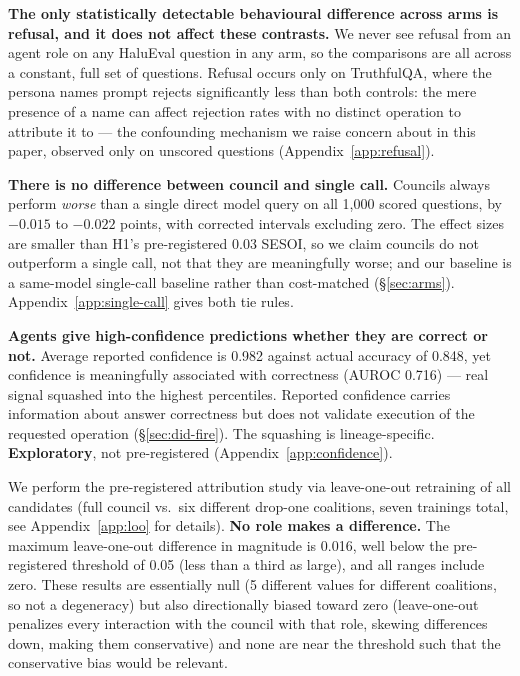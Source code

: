 \textbf{The only statistically detectable behavioural difference across arms is refusal, and it does
not affect these contrasts.} We never see refusal from an agent role on any HaluEval question in any
arm, so the comparisons are all across a constant, full set of questions. Refusal occurs only on
TruthfulQA, where the persona names prompt rejects significantly less than both controls: the mere
presence of a name can affect rejection rates with no distinct operation to attribute it to --- the
confounding mechanism we raise concern about in this paper, observed only on unscored questions
(Appendix~\ref{app:refusal}).

\textbf{There is no difference between council and single call.} Councils always perform \emph{worse}
than a single direct model query on all 1,000 scored questions, by $-0.015$ to $-0.022$ points, with
corrected intervals excluding zero. The effect sizes are smaller than H1's pre-registered 0.03
SESOI, so we claim councils do not outperform a single call, not that they are meaningfully worse;
and our baseline is a same-model single-call baseline rather than cost-matched (\S\ref{sec:arms}).
Appendix~\ref{app:single-call} gives both tie rules.

\textbf{Agents give high-confidence predictions whether they are correct or not.} Average reported
confidence is 0.982 against actual accuracy of 0.848, yet confidence is meaningfully associated with
correctness (AUROC 0.716) --- real signal squashed into the highest percentiles. Reported confidence
carries information about answer correctness but does not validate execution of the requested
operation (\S\ref{sec:did-fire}). The squashing is lineage-specific. \textbf{Exploratory}, not
pre-registered (Appendix~\ref{app:confidence}).

We perform the pre-registered attribution study via leave-one-out retraining of all candidates (full
council vs.\ six different drop-one coalitions, seven trainings total, see
Appendix~\ref{app:loo} for details). \textbf{No role makes a difference.} The maximum leave-one-out
difference in magnitude is 0.016, well below the pre-registered threshold of 0.05 (less than a third
as large), and all ranges include zero. These results are essentially null (5 different values for
different coalitions, so not a degeneracy) but also directionally biased toward zero (leave-one-out
penalizes every interaction with the council with that role, skewing differences down, making them
conservative) and none are near the threshold such that the conservative bias would be relevant.

